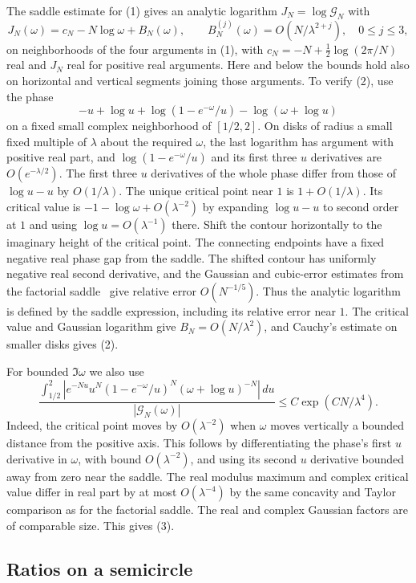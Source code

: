 \documentclass[11pt]{article}
\begin{document}
The saddle estimate for (1) gives an analytic logarithm $J_N=\log\mathcal G_N$ with
\[
 J_N(\omega)=c_N-N\log\omega+B_N(\omega),\qquad
 B_N^{(j)}(\omega)=O(N/\lambda^{2+j}),\quad 0\le j\le3,
 \tag{2}
\]
on neighborhoods of the four arguments in (1), with $c_N=-N+\frac12\log(2\pi/N)$ real and $J_N$ real for positive real arguments. Here and below the bounds hold also on horizontal and vertical segments joining those arguments. To verify (2), use the phase
\[
 -u+\log u+\log(1-e^{-\omega}/u)-\log(\omega+\log u)
\]
on a fixed small complex neighborhood of $[1/2,2]$. On disks of radius a small fixed multiple of $\lambda$ about the required $\omega$, the last logarithm has argument with positive real part, and $\log(1-e^{-\omega}/u)$ and its first three $u$ derivatives are $O(e^{-\lambda/2})$. The first three $u$ derivatives of the whole phase differ from those of $\log u-u$ by $O(1/\lambda)$. The unique critical point near $1$ is $1+O(1/\lambda)$. Its critical value is $-1-\log\omega+O(\lambda^{-2})$ by expanding $\log u-u$ to second order at $1$ and using $\log u=O(\lambda^{-1})$ there. Shift the contour horizontally to the imaginary height of the critical point. The connecting endpoints have a fixed negative real phase gap from the saddle. The shifted contour has uniformly negative real second derivative, and the Gaussian and cubic-error estimates from the factorial saddle~\cite{disk} give relative error $O(N^{-1/5})$. Thus the analytic logarithm is defined by the saddle expression, including its relative error near $1$. The critical value and Gaussian logarithm give $B_N=O(N/\lambda^2)$, and Cauchy's estimate on smaller disks gives (2).

For bounded $\Im\omega$ we also use
\[
 \frac{\int_{1/2}^2
 |e^{-Nu}u^N(1-e^{-\omega}/u)^N(\omega+\log u)^{-N}|\,du}
 {|\mathcal G_N(\omega)|}
 \le C\exp(CN/\lambda^4).
 \tag{3}
\]
Indeed, the critical point moves by $O(\lambda^{-2})$ when $\omega$ moves vertically a bounded distance from the positive axis. This follows by differentiating the phase's first $u$ derivative in $\omega$, with bound $O(\lambda^{-2})$, and using its second $u$ derivative bounded away from zero near the saddle. The real modulus maximum and complex critical value differ in real part by at most $O(\lambda^{-4})$ by the same concavity and Taylor comparison as for the factorial saddle. The real and complex Gaussian factors are of comparable size. This gives (3).

\subsection{Ratios on a semicircle}
\end{document}
